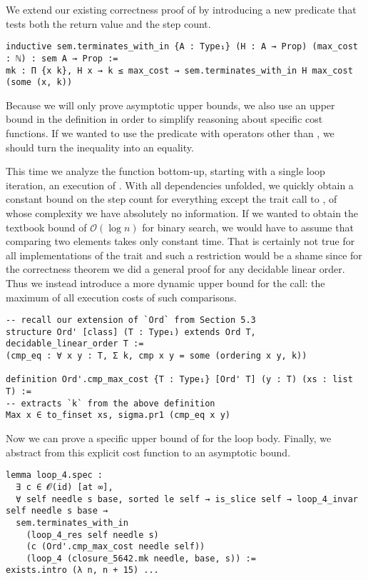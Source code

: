 We extend our existing correctness proof of  by introducing
a new predicate that tests both the return value and the step count.

\begin{verbatim}
inductive sem.terminates_with_in {A : Type₁} (H : A → Prop) (max_cost : ℕ) : sem A → Prop :=
mk : Π {x k}, H x → k ≤ max_cost → sem.terminates_with_in H max_cost (some (x, k))
\end{verbatim}

Because we will only prove asymptotic upper bounds, we also use an upper bound
in the definition in order to simplify reasoning about specific cost functions.
If we wanted to use the predicate with operators other than , we should turn the inequality
into an equality.

This time we analyze the function bottom-up, starting with a single loop iteration, \ie
an execution of . With all dependencies unfolded, we quickly obtain a
constant bound on the step count for everything except the trait call to
, of whose complexity we have absolutely no information. If we wanted
to obtain the textbook bound of $\mathcal{O}(\log n)$ for binary search, we would
have to assume that comparing two elements takes only constant time. That is
certainly not true for all implementations of the trait and such a
restriction would be a shame since for the correctness theorem we did a general proof for any
decidable linear order. Thus we instead introduce a more dynamic upper bound for
the call: the maximum of all execution costs of such comparisons.

\begin{verbatim}
-- recall our extension of `Ord` from Section 5.3
structure Ord' [class] (T : Type₁) extends Ord T, decidable_linear_order T :=
(cmp_eq : ∀ x y : T, Σ k, cmp x y = some (ordering x y, k))

definition Ord'.cmp_max_cost {T : Type₁} [Ord' T] (y : T) (xs : list T) :=
-- extracts `k` from the above definition
Max x ∈ to_finset xs, sigma.pr1 (cmp_eq x y)
\end{verbatim}

Now we can prove a specific upper bound of  for the loop body. Finally, we abstract from this explicit cost function
to an asymptotic bound.

\begin{verbatim}
lemma loop_4.spec :
  ∃ c ∈ 𝓞(id) [at ∞],
  ∀ self needle s base, sorted le self → is_slice self → loop_4_invar self needle s base →
  sem.terminates_with_in
    (loop_4_res self needle s)
    (c (Ord'.cmp_max_cost needle self))
    (loop_4 (closure_5642.mk needle, base, s)) :=
exists.intro (λ n, n + 15) ...
\end{verbatim}

